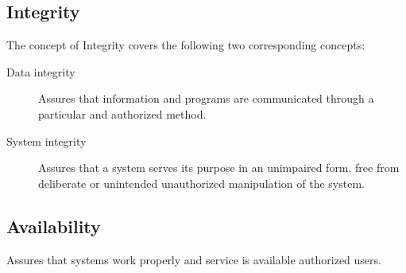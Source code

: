 \documentclass[../index.tex]{subfiles}
\begin{document}
\subsection{Integrity}

The concept of Integrity covers the following two corresponding concepts:

\begin{description}

  \item[Data integrity] Assures that information and programs are communicated through a particular
    and authorized method.

  \item[System integrity] Assures that a system serves its purpose in an unimpaired form, free from
    deliberate or unintended unauthorized manipulation of the system.

\end{description}

\subsection{Availability}

Assures that systems work properly and service is available authorized users.
\end{document}
